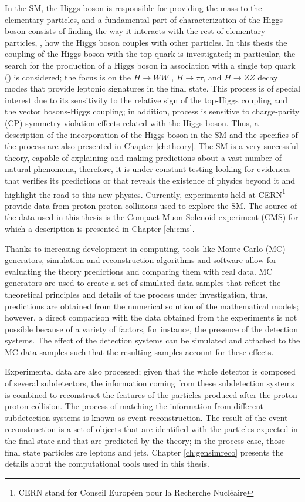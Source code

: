 In the SM, the Higgs boson is responsible for providing the mass to the elementary particles, and a fundamental part of characterization of the Higgs boson consists of finding the way it interacts with the rest of elementary particles, \ie, how the Higgs boson couples with other particles. In this thesis the coupling of the Higgs boson with the top quark is investigated; in particular, the search for the production of a Higgs boson in association with a single top quark (\tH) is considered; the focus is on the $H \to WW$ , $H \to \tau\tau$, and $H \to ZZ$ decay modes that provide leptonic signatures in the final state. This process is of special interest due to its sensitivity to the relative sign of the top-Higgs coupling and the vector bosons-Higgs coupling; in addition, \tH process is sensitive to charge-parity (CP) symmetry violation effects related with the Higgs boson. Thus, a description of the incorporation of the Higgs boson in the SM and the specifics of the \tH process are also presented in Chapter \ref{ch:theory}.               
The SM is a very successful theory, capable of explaining and making predictions about a vast number of natural phenomena, therefore, it is under constant testing looking for evidences that verifies its predictions or that reveals the existence of physics beyond it and highlight the road to this new physics. Currently, experiments held at CERN\footnote{CERN stand for Conseil Europ\'een pour la Recherche Nucl\'eaire} provide data from proton-proton collisions used to explore the SM. The source of the data used in this thesis is the Compact Muon Solenoid experiment (CMS) for which a description is presented in Chapter \ref{ch:cms}.

Thanks to increasing development in computing, tools like Monte Carlo (MC) generators, simulation and reconstruction algorithms and software allow for evaluating the theory predictions and comparing them with real data. MC generators are used to create a set of simulated data samples that reflect the theoretical principles and details of the process under investigation, thus, predictions are obtained from the numerical solution of the mathematical models; however, a direct comparison with the data obtained from the experiments is not possible because of a variety of factors, for instance, the presence of the detection systems. The effect of the detection systems can be simulated and attached to the MC data samples such that the resulting samples account for these effects.

Experimental data are also processed; given that the whole detector is composed of several subdetectors, the information coming from these subdetection systems is combined to reconstruct the features of the particles produced after the proton-proton collision. The process of matching the information from different subdetection systems is known as event reconstruction. The result of the event reconstruction is a set of objects that are identified with the particles expected in the final state and that are predicted by the theory; in the \tH process case, those final state particles are leptons and jets. Chapter \ref{ch:gensimreco} presents the details about the computational tools used in this thesis.  

